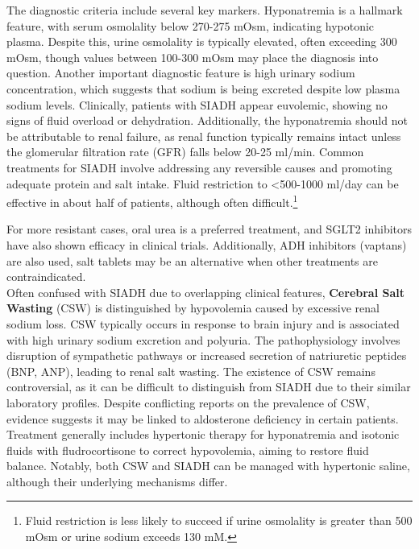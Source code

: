 The diagnostic criteria include several key markers. Hyponatremia is a hallmark feature, with serum osmolality below 270-275 mOsm, indicating hypotonic plasma. Despite this, urine osmolality is typically elevated, often exceeding 300 mOsm, though values between 100-300 mOsm may place the diagnosis into question. Another important diagnostic feature is high urinary sodium concentration, which suggests that sodium is being excreted despite low plasma sodium levels. Clinically, patients with SIADH appear euvolemic, showing no signs of fluid overload or dehydration. Additionally, the hyponatremia should not be attributable to renal failure, as renal function typically remains intact unless the glomerular filtration rate (GFR) falls below 20-25 ml/min. Common treatments for SIADH involve addressing any reversible causes and promoting adequate protein and salt intake. Fluid restriction to <500-1000 ml/day can be effective in about half of patients, although often difficult.\footnote {Fluid restriction is less likely to succeed if urine osmolality is greater than 500 mOsm or urine sodium exceeds 130 mM.\cite{warrenSyndromeInappropriateAntidiuresis2023}}

For more resistant cases, oral urea is a preferred treatment, and SGLT2 inhibitors have also shown efficacy in clinical trials. Additionally, ADH inhibitors (vaptans) are also used, salt tablets may be an alternative when other treatments are contraindicated.\\

Often confused with SIADH due to overlapping clinical features, \textbf {Cerebral Salt Wasting} (CSW) is distinguished by hypovolemia caused by excessive renal sodium loss. CSW typically occurs in response to brain injury and is associated with high urinary sodium excretion and polyuria. The pathophysiology involves disruption of sympathetic pathways or increased secretion of natriuretic peptides (BNP, ANP), leading to renal salt wasting. The existence of CSW remains controversial, as it can be difficult to distinguish from SIADH due to their similar laboratory profiles. Despite conflicting reports on the prevalence of CSW, evidence suggests it may be linked to aldosterone deficiency in certain patients. Treatment generally includes hypertonic therapy for hyponatremia and isotonic fluids with fludrocortisone to correct hypovolemia, aiming to restore fluid balance. Notably, both CSW and SIADH can be managed with hypertonic saline, although their underlying mechanisms differ\cite{sternsCerebralSaltWasting2008}.\\

